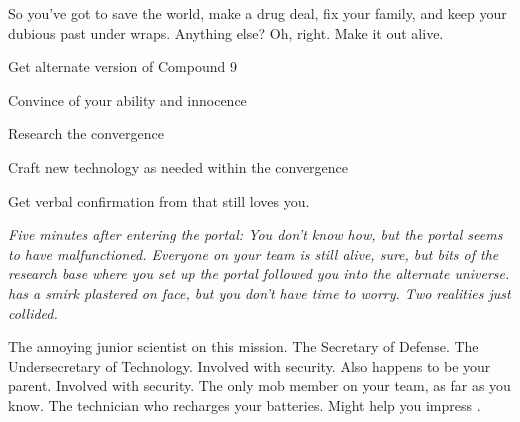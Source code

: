 \documentclass[char]{guildcamp3}
\begin{document}
So you've got to save the world, make a drug deal, fix your family, and keep your dubious past under wraps. Anything else? Oh, right. Make it out alive.

\begin{itemz}[Goals]
  \item Get alternate version of Compound 9
  \item Convince \cSciTwo{} of your ability and innocence
  \item Research the convergence
  \item Craft new technology as needed within the convergence
  \item Get verbal confirmation from \cSpecOpOne{} that \cSpecOpOne{\they} still loves you.
\end{itemz}


\em{Five minutes after entering the portal:}
You don't know how, but the portal seems to have malfunctioned. Everyone on your team is still alive, sure, but bits of the research base where you set up the portal followed you into the alternate universe. \cSciOne{} has a smirk plastered on \cSciOne{\their} face, but you don't have time to worry. Two realities  just collided.


\begin{contacts}
  \contact{\cSciTwo{}} The annoying junior scientist on this mission.
  \contact{\cPoliOne{}} The Secretary of Defense.
  \contact{\cPoliTwo{}} The Undersecretary of Technology.
  \contact{\cSpecOpOne{}} Involved with security. Also happens to be your parent.
  \contact{\cSpecOpTwo{}} Involved with security. The only mob member on your team, as far as you know.
  \contact{\cTech{}} The technician who recharges your batteries. Might help you impress \cSciTwo{}.
\end{contacts}
\end{document}
